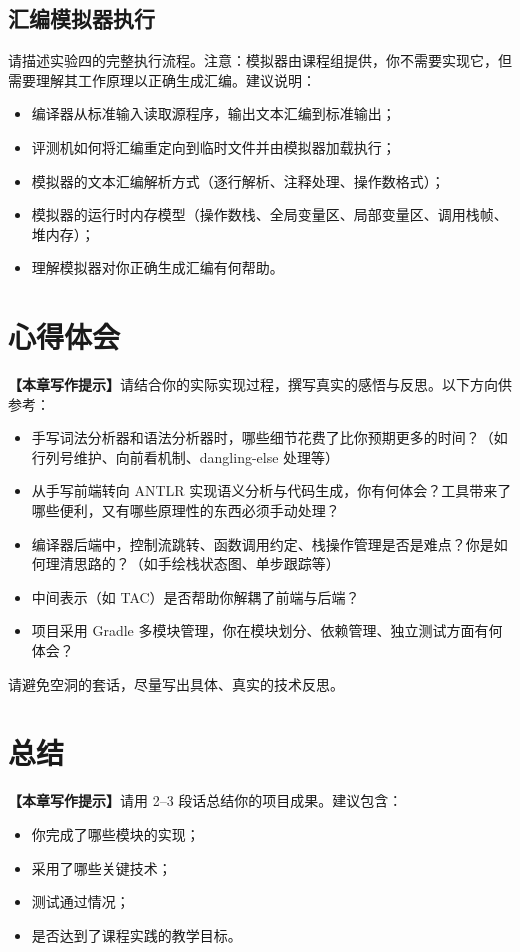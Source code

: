 \documentclass[12pt,hyperref,a4paper,UTF8]{ctexart}
\begin{document}
\subsection{汇编模拟器执行}

请描述实验四的完整执行流程。注意：模拟器由课程组提供，你不需要实现它，但需要理解其工作原理以正确生成汇编。建议说明：
\begin{itemize}
    \item 编译器从标准输入读取源程序，输出文本汇编到标准输出；
    \item 评测机如何将汇编重定向到临时文件并由模拟器加载执行；
    \item 模拟器的文本汇编解析方式（逐行解析、注释处理、操作数格式）；
    \item 模拟器的运行时内存模型（操作数栈、全局变量区、局部变量区、调用栈帧、堆内存）；
    \item 理解模拟器对你正确生成汇编有何帮助。
\end{itemize}

\section{心得体会}

\textbf{【本章写作提示】}请结合你的实际实现过程，撰写真实的感悟与反思。以下方向供参考：

\begin{itemize}
    \item 手写词法分析器和语法分析器时，哪些细节花费了比你预期更多的时间？（如行列号维护、向前看机制、dangling-else 处理等）
    \item 从手写前端转向 ANTLR 实现语义分析与代码生成，你有何体会？工具带来了哪些便利，又有哪些原理性的东西必须手动处理？
    \item 编译器后端中，控制流跳转、函数调用约定、栈操作管理是否是难点？你是如何理清思路的？（如手绘栈状态图、单步跟踪等）
    \item 中间表示（如 TAC）是否帮助你解耦了前端与后端？
    \item 项目采用 Gradle 多模块管理，你在模块划分、依赖管理、独立测试方面有何体会？
\end{itemize}

请避免空洞的套话，尽量写出具体、真实的技术反思。

\section{总结}

\textbf{【本章写作提示】}请用 2--3 段话总结你的项目成果。建议包含：
\begin{itemize}
    \item 你完成了哪些模块的实现；
    \item 采用了哪些关键技术；
    \item 测试通过情况；
    \item 是否达到了课程实践的教学目标。
\end{itemize}
\end{document}
